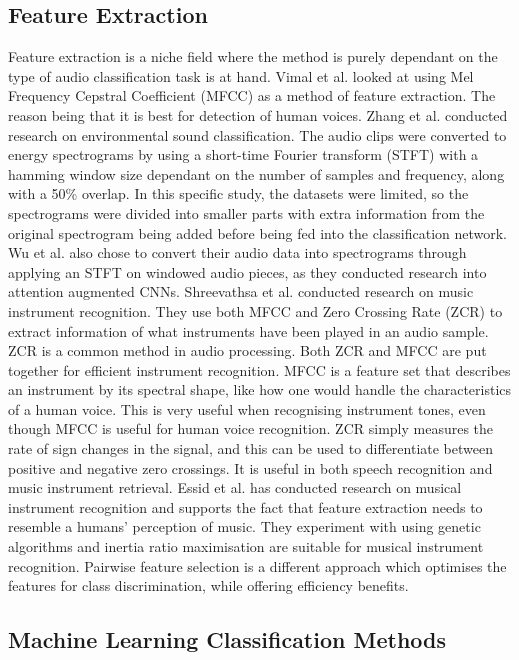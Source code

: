 \subsection{Feature Extraction}

Feature extraction is a niche field where the method is purely dependant on the type of audio classification task is at hand. Vimal et al. looked at using Mel Frequency Cepstral Coefficient (MFCC) as a method of feature extraction. The reason being that it is best for detection of human voices. Zhang et al. conducted research on environmental sound classification. The audio clips were converted to energy spectrograms by using a short-time Fourier transform (STFT) with a hamming window size dependant on the number of samples and frequency, along with a 50\% overlap. In this specific study, the datasets were limited, so the spectrograms were divided into smaller parts with extra information from the original spectrogram being added before being fed into the classification network. Wu et al. also chose to convert their audio data into spectrograms through applying an STFT on windowed audio pieces, as they conducted research into attention augmented CNNs. 
Shreevathsa et al. conducted research on music instrument recognition. They use both MFCC and Zero Crossing Rate (ZCR) to extract information of what instruments have been played in an audio sample. ZCR is a common method in audio processing. Both ZCR and MFCC are put together for efficient instrument recognition. MFCC is a feature set that describes an instrument by its spectral shape, like how one would handle the characteristics of a human voice. This is very useful when recognising instrument tones, even though MFCC is useful for human voice recognition. ZCR simply measures the rate of sign changes in the signal, and this can be used to differentiate between positive and negative zero crossings. It is useful in both speech recognition and music instrument retrieval. Essid et al. has conducted research on musical instrument recognition and supports the fact that feature extraction needs to resemble a humans’ perception of music. They experiment with using genetic algorithms and inertia ratio maximisation are suitable for musical instrument recognition. Pairwise feature selection is a different approach which optimises the features for class discrimination, while offering efficiency benefits. 

\subsection{Machine Learning Classification Methods}

